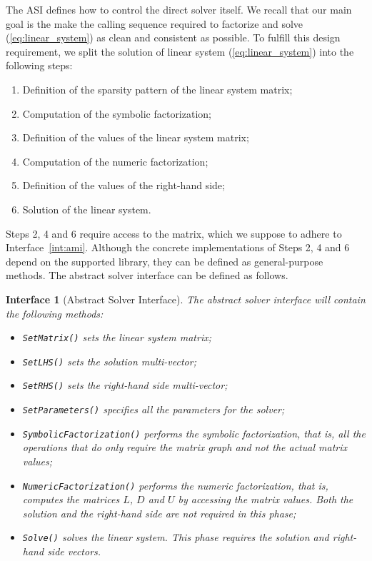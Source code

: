 \documentclass[acmtocl]{acmtrans2m}
\newtheorem{interface}{Interface}[section]
\begin{document}
The ASI defines how to control the direct solver itself.
We recall that our main goal is the make the calling sequence required to
factorize and solve (\ref{eq:linear_system}) as clean and consistent as
possible.
To fulfill this design requirement, we split the solution
of linear system (\ref{eq:linear_system}) into the
following steps:
\begin{enumerate}
\item Definition of the sparsity pattern of the linear system matrix;
\item Computation of the symbolic factorization;
\item Definition of the values of the linear system matrix;
\item Computation of the numeric factorization;
\item Definition of the values of the right-hand side;
\item Solution of the linear system.
\end{enumerate}
Steps 2, 4 and 6 require access to the matrix, which we suppose to adhere to
Interface~\ref{int:ami}. Although the concrete implementations of Steps 2, 4
and 6 depend on the supported library, they can be defined as general-purpose
methods.
The abstract solver interface can be defined as follows.
\begin{interface}[Abstract Solver Interface] 
\label{int:asi}
The abstract solver interface
will contain the following methods:
\begin{itemize}
\item \verb!SetMatrix()! sets the linear system matrix;
\item \verb!SetLHS()! sets the solution multi-vector;
\item \verb!SetRHS()! sets the right-hand side multi-vector;
\item \verb!SetParameters()! specifies all the parameters for the solver;
\item \verb!SymbolicFactorization()! performs the symbolic factorization, that
is, all the operations that do only require the matrix graph and not the
actual matrix values;
\item \verb!NumericFactorization()! performs the numeric factorization, that
is, computes the matrices $L$, $D$ and $U$ by accessing the matrix values.
Both the solution and the right-hand side are not required in this phase;
\item \verb!Solve()! solves the linear system. This phase requires the
solution and right-hand side vectors.
\end{itemize}
\end{interface}
\end{document}
